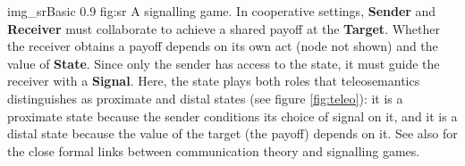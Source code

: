 \begin{myfig}
    {img_srBasic} %
    {0.9} %
    {fig:sr} %
    {A signalling game.
    In cooperative settings, \textbf{Sender} and \textbf{Receiver} must collaborate to achieve a shared payoff at the \textbf{Target}.
    Whether the receiver obtains a payoff depends on its own act (node not shown) and the value of \textbf{State}.
    Since only the sender has access to the state, it must guide the receiver with a \textbf{Signal}.
    Here, the state plays both roles that teleosemantics distinguishes as proximate and distal states (see figure \ref{fig:teleo}): it is a proximate state because the sender conditions its choice of signal on it, and it is a distal state because the value of the target (the payoff) depends on it.
    See also \citet{martinez2019deception} for the close formal links between communication theory and signalling games.
    } %
\end{myfig}